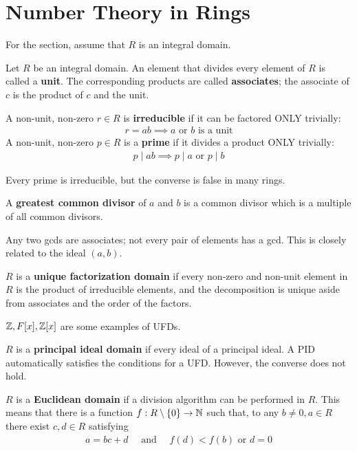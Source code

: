 \documentclass{memoir}
\begin{document}
\section{Number Theory in Rings}
\label{sec:number_theory_in_rings}
For the section, assume that \(R\) is an integral domain.
\begin{defn}
	Let \(R\) be an integral domain. An element that divides every element of \(R\) is called a \textbf{unit}. The corresponding products are called \textbf{associates}; the associate of \(c\) is the product of \(c\) and the unit.
\end{defn}
\begin{defn}
	A non-unit, non-zero \(r \in R\) is \textbf{irreducible} if it can be factored ONLY trivially:
	\begin{align*}
		r = ab \implies a \text{ or } b \text{ is a unit}
	\end{align*}
	A non-unit, non-zero \(p \in R\) is a \textbf{prime} if it divides a product ONLY trivially: 
	\begin{align*}
		p \mid ab \implies p \mid a \text{ or } p \mid b
	\end{align*}
\end{defn}
Every prime is irreducible, but the converse is false in many rings.
\begin{defn}
	A \textbf{greatest common divisor} of \(a\) and \(b\) is a common divisor which is a multiple of all common divisors.
\end{defn}
Any two gcds are associates; not every pair of elements has a gcd. This is closely related to the ideal \((a,b)\).
 \begin{defn}[UFD]
	\(R\) is a \textbf{unique factorization domain} if every non-zero and non-unit element in \(R\) is the product of irreducible elements, and the decomposition is unique aside from associates and the order of the factors.
\end{defn}
\(\mathbb{Z},F[x],\mathbb{Z}[x]\) are some examples of UFDs.
\begin{defn}[PID]
	\(R\) is a \textbf{principal ideal domain} if every ideal of a principal ideal. A PID automatically satisfies the conditions for a UFD. However, the converse does not hold.
\end{defn}
\begin{defn}[ED]
	\(R\) is a \textbf{Euclidean domain} if a division algorithm can be performed in \(R\). This means that there is a function \(f:R\setminus \left\{ 0 \right\} \to \mathbb{N}\) such that, to any \(b\neq 0, a \in R\) there exist \(c,d \in R\) satisfying
	\begin{align*}
		a = bc + d \quad \text{ and } \quad f(d) < f(b) \text{ or }d = 0
	\end{align*}
\end{defn} 
\end{document}
